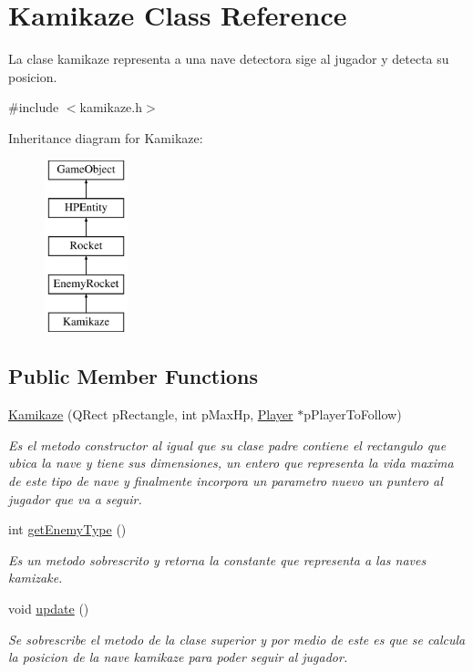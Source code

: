 \hypertarget{class_kamikaze}{\section{Kamikaze Class Reference}
\label{class_kamikaze}
}


La clase kamikaze representa a una nave detectora sige al jugador y detecta su posicion.  




{\ttfamily \#include $<$kamikaze.\-h$>$}

Inheritance diagram for Kamikaze\-:\begin{figure}[H]
\begin{center}
\leavevmode
\includegraphics[height=5.000000cm]{class_kamikaze}
\end{center}
\end{figure}
\subsection*{Public Member Functions}
\begin{DoxyCompactItemize}
\item 
\hyperlink{class_kamikaze_a11b1e38216e4d3da5821b1ea31f326b0}{Kamikaze} (Q\-Rect p\-Rectangle, int p\-Max\-Hp, \hyperlink{class_player}{Player} $\ast$p\-Player\-To\-Follow)
\begin{DoxyCompactList}\small\item\em Es el metodo constructor al igual que su clase padre contiene el rectangulo que ubica la nave y tiene sus dimensiones, un entero que representa la vida maxima de este tipo de nave y finalmente incorpora un parametro nuevo un puntero al jugador que va a seguir. \end{DoxyCompactList}\item 
int \hyperlink{class_kamikaze_ae82e6a48d3e927c65fcd64269a533377}{get\-Enemy\-Type} ()
\begin{DoxyCompactList}\small\item\em Es un metodo sobrescrito y retorna la constante que representa a las naves kamizake. \end{DoxyCompactList}\item 
\hypertarget{class_kamikaze_a9af97de13e4f0306c95124f56580a8aa}{void \hyperlink{class_kamikaze_a9af97de13e4f0306c95124f56580a8aa}{update} ()}\label{class_kamikaze_a9af97de13e4f0306c95124f56580a8aa}

\begin{DoxyCompactList}\small\item\em Se sobrescribe el metodo de la clase superior y por medio de este es que se calcula la posicion de la nave kamikaze para poder seguir al jugador. \end{DoxyCompactList}\end{DoxyCompactItemize}
